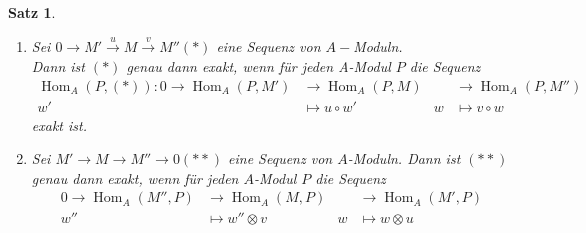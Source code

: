 \documentclass[10pt,a4paper]{article}
\newcommand{\Hom}{\operatorname{Hom}}
\newcounter{thm}[section]
\theoremstyle{definition}
\theoremstyle{plain}
\newtheorem{satz}[thm]{Satz}
\theoremstyle{remark}
\begin{document}
\begin{satz}\label{312satz}
	\begin{enumerate}
		\item Sei $0\rightarrow M'\xrightarrow{u}M\xrightarrow{v}M''(*)$ eine Sequenz von $A-$Moduln.\\
		Dann ist $(*)$ genau dann exakt, wenn für jeden A-Modul $P$ die Sequenz
		\begin{align*}
		\Hom_A(P,(*)):0\rightarrow \Hom_A(P,M')&\rightarrow \Hom_A(P,M)&&\rightarrow \Hom_A(P,M'')\\
		w'&\mapsto u\circ w'&w&\mapsto v\circ w
		\end{align*}
		exakt ist.
		\item Sei $M'\to M\to M''\to 0 (**)$ eine Sequenz von $A$-Moduln. Dann ist $(**)$ genau dann exakt, wenn für jeden $A$-Modul $P$ die Sequenz
		\begin{align*}
		0\to\Hom_A(M'',P)&\to\Hom_A(M,P)&&\to\Hom_A(M',P)\\
		w''&\mapsto w''\otimes v&w&\mapsto w\otimes u
		\end{align*}
	\end{enumerate}
\end{satz}
\end{document}
